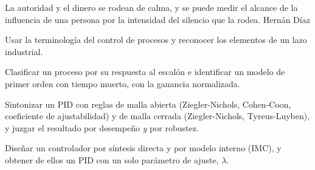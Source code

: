 
  {La autoridad y el dinero se rodean de calma, y se puede medir el alcance de la influencia de una persona por la intensidad del silencio que la rodea.}
  {Hernán Díaz}

\begin{objetivos}
  \item Usar la terminología del control de procesos y reconocer los elementos de un lazo industrial.
  \item Clasificar un proceso por su respuesta al escalón e identificar un modelo de primer orden con tiempo muerto, con la ganancia normalizada.
  \item Sintonizar un PID con reglas de malla abierta (Ziegler-Nichols, Cohen-Coon, coeficiente de ajustabilidad) y de malla cerrada (Ziegler-Nichols, Tyreus-Luyben), y juzgar el resultado por desempeño \emph{y} por robustez.
  \item Diseñar un controlador por síntesis directa y por modelo interno (IMC), y obtener de ellos un PID con un solo parámetro de ajuste, $\lambda$.
\end{objetivos}









